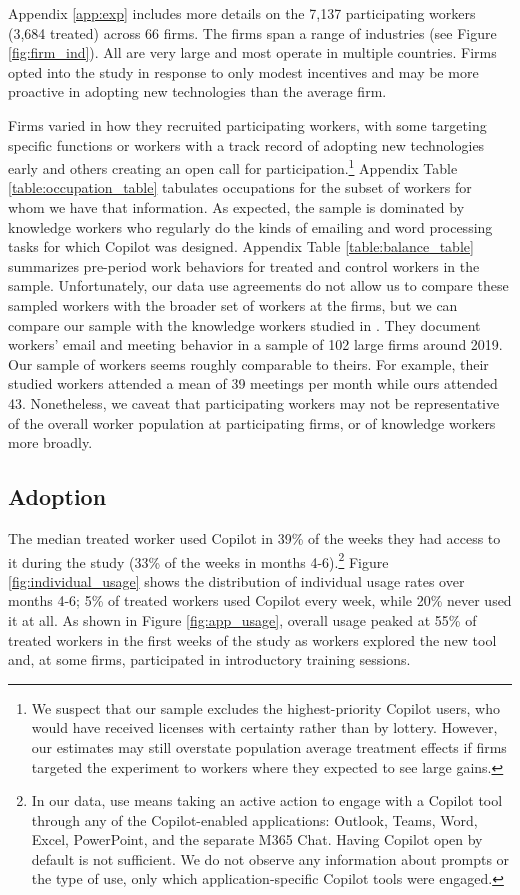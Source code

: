\documentclass{article}
\begin{document}
Appendix \ref{app:exp} includes more details on the 7,137 participating workers (3,684 treated) across 66 firms. The firms span a range of industries (see Figure \ref{fig:firm_ind}). All are very large and most operate in multiple countries. Firms opted into the study in response to only modest incentives and may be more proactive in adopting new technologies than the average firm. 

Firms varied in how they recruited participating workers, with some targeting specific functions or workers with a track record of adopting new technologies early and others creating an open call for participation.\footnote{We suspect that our sample excludes the highest-priority Copilot users, who would have received licenses with certainty rather than by lottery. However, our estimates may still overstate population average treatment effects if firms targeted the experiment to workers where they expected to see large gains.} Appendix Table \ref{table:occupation_table} tabulates occupations for the subset of workers for whom we have that information. As expected, the sample is dominated by knowledge workers who regularly do the kinds of emailing and word processing tasks for which Copilot was designed. Appendix Table \ref{table:balance_table} summarizes pre-period work behaviors for treated and control workers in the sample. Unfortunately, our data use agreements do not allow us to compare these sampled workers with the broader set of workers at the firms, but we can compare our sample with the knowledge workers studied in \citet{impink2025communication}.  They document workers' email and meeting behavior in a sample of 102 large firms around 2019. Our sample of workers seems roughly comparable to theirs. For example, their studied workers attended a mean of 39 meetings per month while ours attended 43. Nonetheless, we caveat that participating workers may not be representative of the overall worker population at participating firms, or of knowledge workers more broadly. 


\subsection{Adoption}
The median treated worker used Copilot in 39\% of the weeks they had access to it during the study (33\% of the weeks in months 4-6).\footnote{In our data, use means taking an active action to engage with a Copilot tool through any of the Copilot-enabled applications: Outlook, Teams, Word, Excel, PowerPoint, and the separate M365 Chat. Having Copilot open by default is not sufficient. We do not observe any information about prompts or the type of use, only which application-specific Copilot tools were engaged.}  Figure \ref{fig:individual_usage} shows the distribution of individual usage rates over months 4-6; 5\% of treated workers used Copilot every week, while 20\% never used it at all. As shown in Figure \ref{fig:app_usage}, overall usage peaked at 55\% of treated workers in the first weeks of the study as workers explored the new tool and, at some firms, participated in introductory training sessions.
\end{document}
